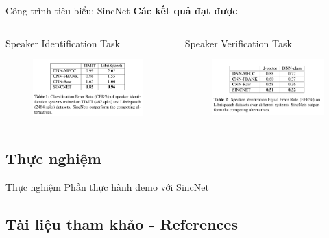 \documentclass[notheorems, aspectratio=54]{beamer}
\begin{document}
\begin{frame}{Công trình tiêu biểu: SincNet}
	\textbf{Các kết quả đạt được}\newline
	\begin{columns}
		\begin{column}{0.5\textwidth}
			Speaker Identification Task
			\begin{figure}[H]
				\includegraphics[width=1\linewidth]{images/performance_speaker_identification.png}
			\end{figure}
		\end{column}
		\begin{column}{0.5\textwidth}
			Speaker Verification Task
			\begin{figure}[H]
				\includegraphics[width=1\linewidth]{images/performance_speaker_verification.png}
			\end{figure}
		\end{column}
	\end{columns}
\end{frame}
\subsection{Thực nghiệm}
\begin{frame}{Thực nghiệm}
	\huge Phần thực hành demo với SincNet
\end{frame}
\subsection{Tài liệu tham khảo - References}
\begin{frame}
	\nocite{*}
	\newpage\cleardoublepage
	
\end{frame}
\end{document}
